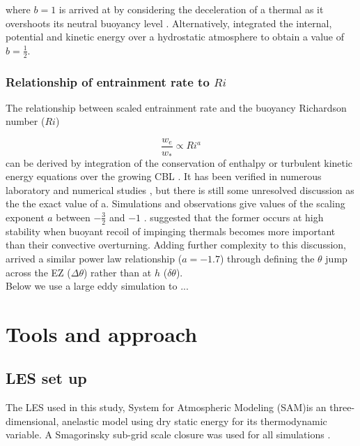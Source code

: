 \documentclass[referee]{svjour3}
\begin{document}
where $b=1$ is arrived at by considering the deceleration of a thermal
as it overshoots its neutral buoyancy level \cite{StullNelEl}.  Alternatively, \cite{Boers89} integrated the internal, potential and kinetic energy over a hydrostatic atmosphere to obtain a value of $b=\frac{1}{2}$.

\subsubsection{Relationship of entrainment rate to $Ri$}
\label{subsec:erri}
The relationship between scaled entrainment rate and the buoyancy Richardson number ($Ri$)

\begin{equation}\label{eq:ervsri}
\frac{w_{e}}{w_{*}} \propto Ri^{a}
\end{equation}
can be derived by integration of the conservation of enthalpy or turbulent kinetic energy equations over the growing CBL \citep{Tennekes73, Deardorff79, Fedorovich04}. It has been verified in numerous laboratory and numerical studies \citep{DearWill80, Sullivan98, Fedorovich04, Brooks12}, but there is still some unresolved discussion as the the exact value of a.  Simulations and observations give  values of the scaling exponent $a$ between $-\frac{3}{2}$ and $-1$ \citep{Traum11}.  \cite{Turner86} suggested that the former occurs at high stability when buoyant recoil of impinging thermals becomes more important than their convective overturning.  Adding further complexity to this discussion, \cite{Fedorovich04} arrived a similar power law relationship ($a = -1.7$) through defining the $\theta$ jump across the EZ ($\Delta \theta$) rather than at $h$ ($\delta \theta$).\\

Below we use a large eddy simulation to ...

\section{Tools and approach}

\subsection{LES set up}

The LES used in this study, System for Atmospheric Modeling (SAM)is an three-dimensional, anelastic model using dry static energy for its thermodynamic variable.  A Smagorinsky sub-grid scale closure was used for all simulations \citep{KhairRand}.
\end{document}

